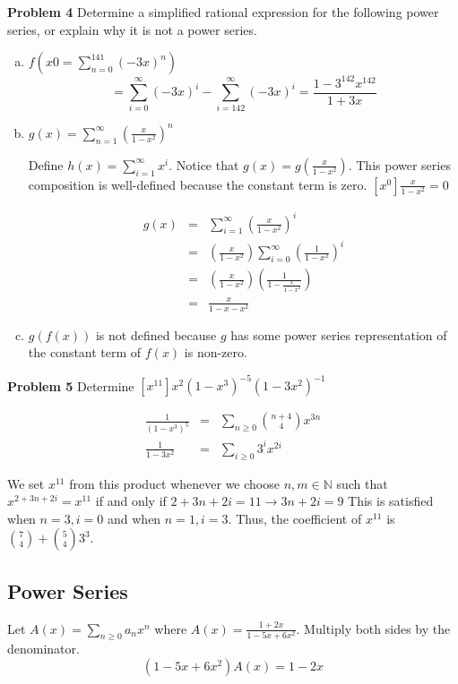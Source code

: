 \documentclass{article}
\begin{document}
\textbf{Problem 4}
Determine a simplified rational expression for the following power series, or explain why it is not a power series.

\begin{enumerate}[a)]
	\item $f(x0 = \sum_{n = 0}^{141} (-3x)^n)$
		$$= \sum_{i = 0}^{\infty} (-3x)^i - \sum_{i = 142}^{\infty} (-3x)^i = \frac{1 - 3^{142}x^{142}}{1 + 3x}$$
	
	\item $g(x) = \sum_{n = 1}^{\infty} (\frac{x}{1-x^2})^n$
	
		Define $h(x) = \sum_{i = 1}^{\infty}x^i$. Notice that $g(x) = g(\frac{x}{1-x^2})$. This power series composition is well-defined because the constant term is zero. $[x^0]\frac{x}{1-x^2} = 0$
		
		\begin{eqnarray*}
			g(x) & = & \sum_{i = 1}^{\infty} (\frac{x}{1-x^2})^i \\
			& = & (\frac{x}{1 - x^2}) \sum_{i = 0}^{\infty}(\frac{1}{1-x^2})^i\\
			& = & (\frac{x}{1 - x^2}) \left(\frac{1}{1 - \frac{x}{1 - x^2}} \right)\\
			& = & \frac{x}{1 - x - x^2}
		\end{eqnarray*}
		
	\item $g(f(x))$ is not defined because $g$ has some power series representation of the constant term of $f(x)$ is non-zero.
\end{enumerate}

\textbf{Problem 5}
Determine $[x^{11}]x^2(1-x^3)^{-5}(1-3x^2)^{-1}$

\begin{eqnarray*}
	\frac{1}{(1-x^3)^5} &=& \sum_{n \ge 0} \binom {n + 4}4 x^{3n}\\
	\frac{1}{1 - 3x^2} & = & \sum_{i \ge 0} 3^ix^{2i}
\end{eqnarray*}

We set $x^{11}$ from this product whenever we choose $n,m \in \mathbb{N}$ such that $x^{2 + 3n+2i} = x^{11}$ if and only if $2+3n+2i=11 \rightarrow 3n+2i = 9$ This is satisfied when $n=3, i = 0$ and when $n=1,i=3$. Thus, the coefficient of $x^{11}$ is $\binom 74 + \binom 54 3^3$.

\subsection{Power Series}
Let $A(x) = \sum_{n \ge 0}a_nx^n$ where $A(x) = \frac{1+2x}{1-5x+6x^2}$. Multiply both sides by the denominator.
$$(1-5x+6x^2)A(x) = 1-2x$$
\end{document}
